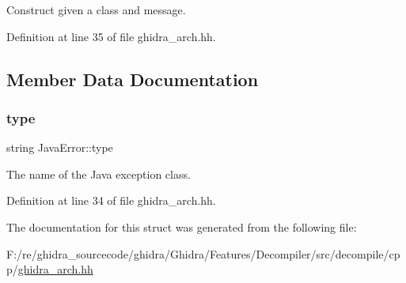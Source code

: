 Construct given a class and message. 



Definition at line 35 of file ghidra\+\_\+arch.\+hh.



\subsection{Member Data Documentation}
\mbox{\label{struct_java_error_a7b3350128bacf6f2828e9cf721460000}} 
\subsubsection{\texorpdfstring{type}{type}}
{\footnotesize\ttfamily string Java\+Error\+::type}



The name of the Java exception class. 



Definition at line 34 of file ghidra\+\_\+arch.\+hh.



The documentation for this struct was generated from the following file\+:\begin{DoxyCompactItemize}
\item 
F\+:/re/ghidra\+\_\+sourcecode/ghidra/\+Ghidra/\+Features/\+Decompiler/src/decompile/cpp/\mbox{\hyperlink{ghidra__arch_8hh}{ghidra\+\_\+arch.\+hh}}\end{DoxyCompactItemize}
